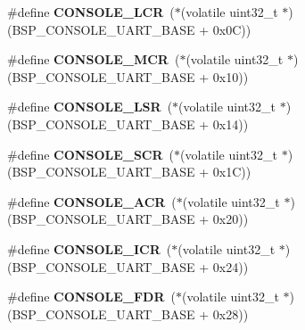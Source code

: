 \begin{DoxyCompactItemize}
\mbox{\label{uart-output-char_8h_ab0b8cbd2ac0d3a4af2854b53acb57ac7}} 
\#define {\bfseries C\+O\+N\+S\+O\+L\+E\+\_\+\+L\+CR}~($\ast$(volatile uint32\+\_\+t $\ast$) (B\+S\+P\+\_\+\+C\+O\+N\+S\+O\+L\+E\+\_\+\+U\+A\+R\+T\+\_\+\+B\+A\+SE + 0x0\+C))
\item 
\mbox{\label{uart-output-char_8h_a8c5b2dc98e753abf63d66011fe75327f}} 
\#define {\bfseries C\+O\+N\+S\+O\+L\+E\+\_\+\+M\+CR}~($\ast$(volatile uint32\+\_\+t $\ast$) (B\+S\+P\+\_\+\+C\+O\+N\+S\+O\+L\+E\+\_\+\+U\+A\+R\+T\+\_\+\+B\+A\+SE + 0x10))
\item 
\mbox{\label{uart-output-char_8h_af02cf375f2295b564f2a51beaa3eb2b7}} 
\#define {\bfseries C\+O\+N\+S\+O\+L\+E\+\_\+\+L\+SR}~($\ast$(volatile uint32\+\_\+t $\ast$) (B\+S\+P\+\_\+\+C\+O\+N\+S\+O\+L\+E\+\_\+\+U\+A\+R\+T\+\_\+\+B\+A\+SE + 0x14))
\item 
\mbox{\label{uart-output-char_8h_ac36ef0e15d8afd9cf1d81ed7e94ef455}} 
\#define {\bfseries C\+O\+N\+S\+O\+L\+E\+\_\+\+S\+CR}~($\ast$(volatile uint32\+\_\+t $\ast$) (B\+S\+P\+\_\+\+C\+O\+N\+S\+O\+L\+E\+\_\+\+U\+A\+R\+T\+\_\+\+B\+A\+SE + 0x1\+C))
\item 
\mbox{\label{uart-output-char_8h_ab7ca621800c3ff01871561e79849c2ba}} 
\#define {\bfseries C\+O\+N\+S\+O\+L\+E\+\_\+\+A\+CR}~($\ast$(volatile uint32\+\_\+t $\ast$) (B\+S\+P\+\_\+\+C\+O\+N\+S\+O\+L\+E\+\_\+\+U\+A\+R\+T\+\_\+\+B\+A\+SE + 0x20))
\item 
\mbox{\label{uart-output-char_8h_a9b37704f6f0278329d082eb0a5723f65}} 
\#define {\bfseries C\+O\+N\+S\+O\+L\+E\+\_\+\+I\+CR}~($\ast$(volatile uint32\+\_\+t $\ast$) (B\+S\+P\+\_\+\+C\+O\+N\+S\+O\+L\+E\+\_\+\+U\+A\+R\+T\+\_\+\+B\+A\+SE + 0x24))
\item 
\mbox{\label{uart-output-char_8h_a0a66c2cdcbe1d421e8d571d839b4e64d}} 
\#define {\bfseries C\+O\+N\+S\+O\+L\+E\+\_\+\+F\+DR}~($\ast$(volatile uint32\+\_\+t $\ast$) (B\+S\+P\+\_\+\+C\+O\+N\+S\+O\+L\+E\+\_\+\+U\+A\+R\+T\+\_\+\+B\+A\+SE + 0x28))
\item 
\mbox{\label{uart-output-char_8h_a3c7ae8b3e4f68c9de6045be237ff9b0e}} 

\end{DoxyCompactItemize}

